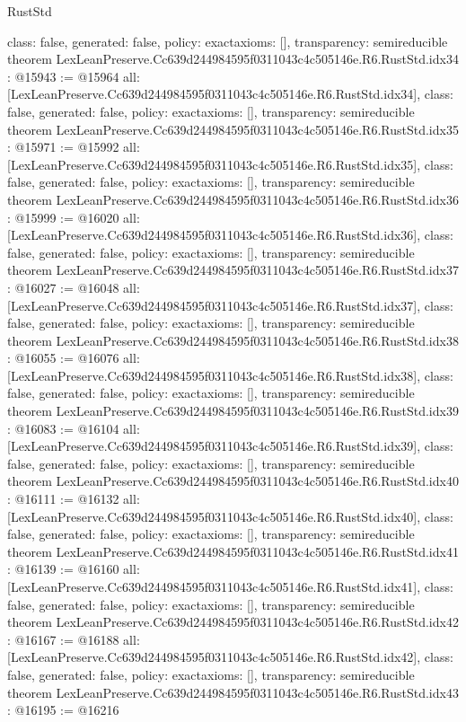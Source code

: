 \begin{lexlean}{RustStd}
\begin{coremodule}
{  class: false,
  generated: false,
  policy: exact{axioms: []},
  transparency: semireducible
}
theorem LexLeanPreserve.Cc639d244984595f0311043c4c505146e.R6.RustStd.idx34 : @15943 := @15964 {
  all: [LexLeanPreserve.Cc639d244984595f0311043c4c505146e.R6.RustStd.idx34],
  class: false,
  generated: false,
  policy: exact{axioms: []},
  transparency: semireducible
}
theorem LexLeanPreserve.Cc639d244984595f0311043c4c505146e.R6.RustStd.idx35 : @15971 := @15992 {
  all: [LexLeanPreserve.Cc639d244984595f0311043c4c505146e.R6.RustStd.idx35],
  class: false,
  generated: false,
  policy: exact{axioms: []},
  transparency: semireducible
}
theorem LexLeanPreserve.Cc639d244984595f0311043c4c505146e.R6.RustStd.idx36 : @15999 := @16020 {
  all: [LexLeanPreserve.Cc639d244984595f0311043c4c505146e.R6.RustStd.idx36],
  class: false,
  generated: false,
  policy: exact{axioms: []},
  transparency: semireducible
}
theorem LexLeanPreserve.Cc639d244984595f0311043c4c505146e.R6.RustStd.idx37 : @16027 := @16048 {
  all: [LexLeanPreserve.Cc639d244984595f0311043c4c505146e.R6.RustStd.idx37],
  class: false,
  generated: false,
  policy: exact{axioms: []},
  transparency: semireducible
}
theorem LexLeanPreserve.Cc639d244984595f0311043c4c505146e.R6.RustStd.idx38 : @16055 := @16076 {
  all: [LexLeanPreserve.Cc639d244984595f0311043c4c505146e.R6.RustStd.idx38],
  class: false,
  generated: false,
  policy: exact{axioms: []},
  transparency: semireducible
}
theorem LexLeanPreserve.Cc639d244984595f0311043c4c505146e.R6.RustStd.idx39 : @16083 := @16104 {
  all: [LexLeanPreserve.Cc639d244984595f0311043c4c505146e.R6.RustStd.idx39],
  class: false,
  generated: false,
  policy: exact{axioms: []},
  transparency: semireducible
}
theorem LexLeanPreserve.Cc639d244984595f0311043c4c505146e.R6.RustStd.idx40 : @16111 := @16132 {
  all: [LexLeanPreserve.Cc639d244984595f0311043c4c505146e.R6.RustStd.idx40],
  class: false,
  generated: false,
  policy: exact{axioms: []},
  transparency: semireducible
}
theorem LexLeanPreserve.Cc639d244984595f0311043c4c505146e.R6.RustStd.idx41 : @16139 := @16160 {
  all: [LexLeanPreserve.Cc639d244984595f0311043c4c505146e.R6.RustStd.idx41],
  class: false,
  generated: false,
  policy: exact{axioms: []},
  transparency: semireducible
}
theorem LexLeanPreserve.Cc639d244984595f0311043c4c505146e.R6.RustStd.idx42 : @16167 := @16188 {
  all: [LexLeanPreserve.Cc639d244984595f0311043c4c505146e.R6.RustStd.idx42],
  class: false,
  generated: false,
  policy: exact{axioms: []},
  transparency: semireducible
}
theorem LexLeanPreserve.Cc639d244984595f0311043c4c505146e.R6.RustStd.idx43 : @16195 := @16216 {
}
\end{coremodule}
\end{lexlean}
